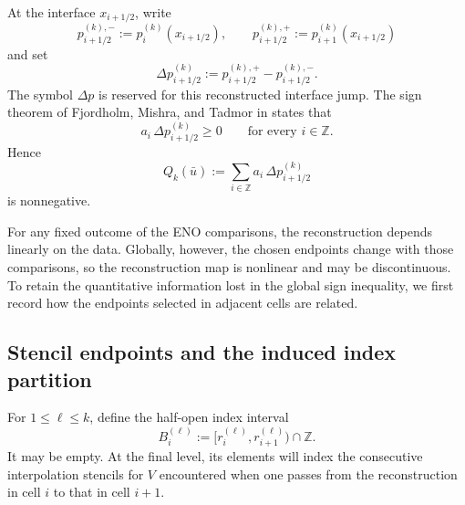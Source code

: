 \documentclass[11pt]{amsart}
\theoremstyle{plain}
\theoremstyle{definition}
\theoremstyle{remark}
\numberwithin{equation}{section}
\theoremstyle{plain}
\begin{document}
At the interface $x_{i+1/2}$, write
\[
p_{i+1/2}^{(k),-}:=p_i^{(k)}(x_{i+1/2}),
\qquad
p_{i+1/2}^{(k),+}:=p_{i+1}^{(k)}(x_{i+1/2})
\]
and set
\begin{equation}\label{eq:reconstructed-interface-jump}
	\Delta p_{i+1/2}^{(k)}
	:=p_{i+1/2}^{(k),+}-p_{i+1/2}^{(k),-}.
\end{equation}
The symbol $\Delta p$ is reserved for this reconstructed interface jump.  The
sign theorem of Fjordholm, Mishra, and Tadmor in \cite{FMT} states that
\begin{equation}\label{eq:fmt-sign-recalled}
	a_i\,\Delta p_{i+1/2}^{(k)}\ge0
	\qquad\text{for every }i\in\mathbb Z.
\end{equation}
Hence
\begin{equation}\label{eq:eno-source-section2}
	Q_k(\bar u)
	:=\sum_{i\in\mathbb Z}a_i\,\Delta p_{i+1/2}^{(k)}
\end{equation}
is nonnegative.

For any fixed outcome of the ENO comparisons, the reconstruction depends
linearly on the data.  Globally, however, the chosen endpoints change with
those comparisons, so the reconstruction map is nonlinear and may be
discontinuous.  To retain the quantitative information lost
in the global sign inequality, we first record how the endpoints selected in
adjacent cells are related.

\subsection{Stencil endpoints and the induced index partition}
\label{sec:eno-index-partition}

For $1\le\ell\le k$, define the half-open index interval
\begin{equation}\label{eq:selected-index-interval}
	B_i^{(\ell)}
	:=[r_i^{(\ell)},r_{i+1}^{(\ell)})\cap\mathbb Z.
\end{equation}
It may be empty.  At the final level, its elements will index the consecutive
interpolation stencils for $V$ encountered when one passes from the
reconstruction in cell $i$ to that in cell $i+1$.
\end{document}
